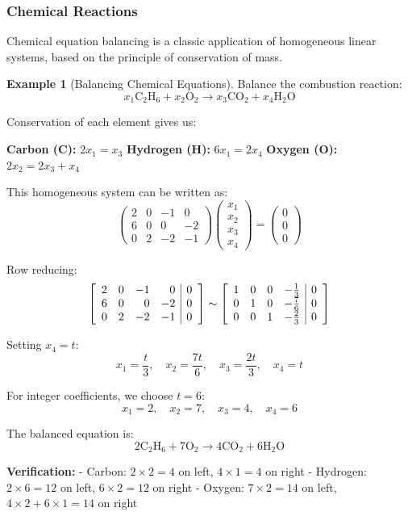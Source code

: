 \documentclass[12pt]{article}
\numberwithin{equation}{section}
\newenvironment{amatrix}[1]{%
  \left[\begin{array}{#1}}
  {\end{array}\right]}
\theoremstyle{plain}
\theoremstyle{definition}
\newtheorem{example}[theorem]{Example}
\theoremstyle{remark}
\begin{document}
\subsubsection{Chemical Reactions}

Chemical equation balancing is a classic application of homogeneous linear systems, based on the principle of conservation of mass.

\begin{example}[Balancing Chemical Equations]
Balance the combustion reaction:
$$x_1 \text{C}_2\text{H}_6 + x_2 \text{O}_2 \rightarrow x_3 \text{CO}_2 + x_4 \text{H}_2\text{O}$$

Conservation of each element gives us:

\textbf{Carbon (C):} $2x_1 = x_3$
\textbf{Hydrogen (H):} $6x_1 = 2x_4$  
\textbf{Oxygen (O):} $2x_2 = 2x_3 + x_4$

This homogeneous system can be written as:
$$\begin{pmatrix}
2 & 0 & -1 & 0\\
6 & 0 & 0 & -2\\
0 & 2 & -2 & -1
\end{pmatrix}\begin{pmatrix} x_1 \\ x_2 \\ x_3 \\ x_4 \end{pmatrix} = \begin{pmatrix} 0 \\ 0 \\ 0 \end{pmatrix}$$

Row reducing:
$$\begin{amatrix}{rrrr|r}
2 & 0 & -1 & 0 & 0\\
6 & 0 & 0 & -2 & 0\\
0 & 2 & -2 & -1 & 0
\end{amatrix} \sim \begin{amatrix}{rrrr|r}
1 & 0 & 0 & -\frac{1}{3} & 0\\
0 & 1 & 0 & -\frac{7}{6} & 0\\
0 & 0 & 1 & -\frac{2}{3} & 0
\end{amatrix}$$

Setting $x_4 = t$:
$$x_1 = \frac{t}{3}, \quad x_2 = \frac{7t}{6}, \quad x_3 = \frac{2t}{3}, \quad x_4 = t$$

For integer coefficients, we choose $t = 6$:
$$x_1 = 2, \quad x_2 = 7, \quad x_3 = 4, \quad x_4 = 6$$

The balanced equation is:
$$2\text{C}_2\text{H}_6 + 7\text{O}_2 \rightarrow 4\text{CO}_2 + 6\text{H}_2\text{O}$$

\textbf{Verification:}
- Carbon: $2 \times 2 = 4$ on left, $4 \times 1 = 4$ on right \checkmark
- Hydrogen: $2 \times 6 = 12$ on left, $6 \times 2 = 12$ on right \checkmark  
- Oxygen: $7 \times 2 = 14$ on left, $4 \times 2 + 6 \times 1 = 14$ on right \checkmark
\end{example}
\end{document}
